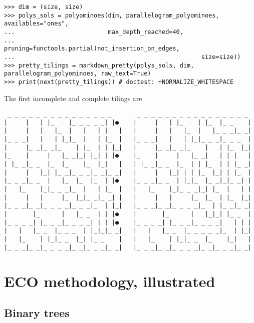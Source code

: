 \begin{verbatim}
>>> dim = (size, size)
>>> polys_sols = polyominoes(dim, parallelogram_polyominoes, availables="ones",
...                          max_depth_reached=40,
...                          pruning=functools.partial(not_insertion_on_edges,
...                                                    size=size))
>>> pretty_tilings = markdown_pretty(polys_sols, dim, parallelogram_polyominoes, raw_text=True)
>>> print(next(pretty_tilings)) # doctest: +NORMALIZE_WHITESPACE
\end{verbatim}
The first incomplete and complete tilings are
\begin{Verbatim}
 _ _ _ _ _ _ _ _ _ _ _ _ _ _ _       _ _ _ _ _ _ _ _ _ _ _ _ _ _ _ _
|     |   | |_    |_ _ _ _ _| |●    |     |   | |_    | |_  |_ _    |
|     |   |   |_  |   |   | |   |   |     |   |   |_  |   |_ _ _|_ _|
|_ _ _|   |   | |_|_  |   | |_  |   |_ _ _|   |   | |_|_ _ _|_ _ _  |
|     |_ _|_ _|_    | |_  | | |_|   |     |_ _|_ _|_    |   | |_  |_|
|_    |     |   |_ _|_| |_| | |●    |_    |     |   |_ _|   | | |   |
| |_ _|_ _  |_  |_    |_  |_|   |   | |_ _|_ _  |_  | | |_  | | |_ _|
|     |   |_| |_ _|_ _ _|_ _|_ _|   |     |   |_| | | |_  |_| | |_  |
|_ _ _|_ _  |   |_  |_  |_  | |●    |_ _ _|_ _  | |_|_  |_ _|_|_ _| |
|   |_    |_|_ _ _|_  |   | |_  |   |   |_    |_|_ _ _|_| |_  |   | |
|     |   |     |_  |_|_ _|_ _| |   |     |   |     |_  |_  | |_  |_|
|_ _ _|_ _|_ _ _ _|_ _ _|_  | |_|   |_ _ _|_ _|_ _ _ _|_  | |_ _|_ _|
|       |_      |   |_ _  | | |●    |       |_      |   |_|_| |_ _  |
|_ _ _ _| |_ _ _|_ _ _ _| | | |●    |_ _ _ _| |_ _ _|_ _ _ _|   | | |
|   |   |_ _  |_ _ _  | |_|_|_ _|   |   |   |_ _  |_ _ _ _ _|_  | |_|
|   |_    | |_|_ _  |_| |_ _    |   |   |_    | |_|_ _  |_    |_|   |
|_ _ _|_ _|_ _ _ _|_ _|_ _ _|_ _|   |_ _ _|_ _|_ _ _ _|_ _|_ _ _|_ _|
\end{Verbatim}


\section{ECO methodology, illustrated}

\newpage
\subsection{Binary trees}


